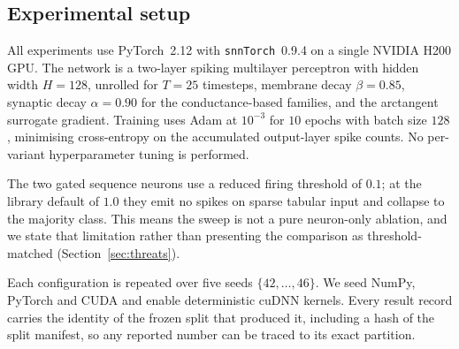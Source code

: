 \subsection{Experimental setup}

All experiments use PyTorch~2.12 with \texttt{snnTorch}~0.9.4 on a
single NVIDIA H200 GPU. The network is a two-layer spiking multilayer perceptron
with hidden width $H=128$, unrolled for $T=25$ timesteps, membrane decay
$\beta=0.85$, synaptic decay $\alpha=0.90$ for the conductance-based families,
and the arctangent surrogate gradient. Training uses Adam at $10^{-3}$ for
$10$ epochs with batch size $128$, minimising cross-entropy on the accumulated
output-layer spike counts. No per-variant hyperparameter tuning is performed.

The two gated sequence neurons use a reduced firing threshold of $0.1$; at the
library default of $1.0$ they emit no spikes on sparse tabular input and
collapse to the majority class. This means the sweep is not a pure neuron-only
ablation, and we state that limitation rather than presenting the comparison as
threshold-matched (Section~\ref{sec:threats}).

Each configuration is repeated over five seeds $\{42,\dots,46\}$. We seed NumPy,
PyTorch and CUDA and enable deterministic cuDNN kernels. Every result record
carries the identity of the frozen split that produced it, including a hash of
the split manifest, so any reported number can be traced to its exact partition.
